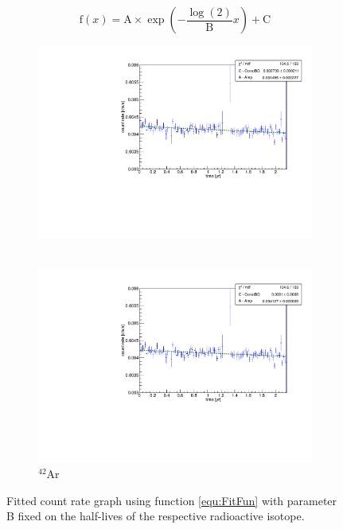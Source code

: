 \documentclass[encoding=utf8,british]{tumphthesis}
\begin{document}
\begin{equation}
\mathrm{f}(x) = \mathrm{A}\times\exp\left(-\frac{\log(2)}{\mathrm{B}} x \right) + \mathrm{C}
\label{equ:FitFun}
\end{equation}
\begin{figure}[t!]
	\centering
	\begin{subfigure}[t]{.475\textwidth}
		\centering
		\includegraphics[width=\textwidth]{./Bilder/eventRateFit.pdf}
		\caption{ \Kr\ }
		\label{fig:eventRateFit}
	\end{subfigure}\hfill%
	\begin{subfigure}[t]{.475\textwidth}
		\centering
		\includegraphics[width=\textwidth]{./Bilder/Argon.pdf}
		\caption{
		$^{42}$Ar
		}
		\label{fig:Argon}
	\end{subfigure}
	\caption{Fitted count rate graph using function \ref{equ:FitFun} with parameter B fixed on the half-lives of the respective radioactive isotope.}
		\label{fig:fit2}
		\vspace{5mm}
\end{figure}
\end{document}
